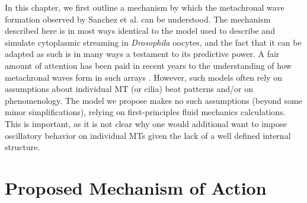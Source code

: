 \documentclass[11pt]{ucthesis}
\begin{document}
In this chapter, we first outline a mechanism by which the metachronal
wave formation observed by Sanchez et al. can be understood. 
The mechanism described here is in most ways
identical to the model used to describe and simulate cytoplasmic
streaming in \textit{Drosophila} oocytes, and the fact that it can
be adapted as such is in many ways a testament to its predictive
power. A fair amount of attention has been paid in recent years to
the understanding of how metachronal waves form in such arrays
\cite{Lagomarsino2003,guirao2007spontaneous,Elgeti2013,Niedermayer2008}. However, such
models often rely on assumptions about individual MT (or cilia)
beat patterns and/or on phenomenology. The model we propose makes
no such assumptions (beyond some minor simplifications), relying
on first-principles fluid mechanics calculations. This is important,
as it is not clear why one would additional want to impose oscillatory behavior
on individual MTs given the lack of a well defined internal structure.



\section{Proposed Mechanism of Action}
\label{sec:mech}
\end{document}
